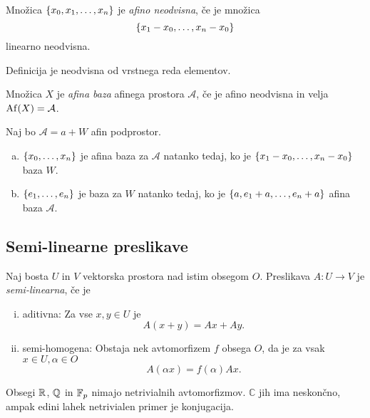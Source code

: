 \begin{definicija}
    Množica $\left\{x_0, x_1, \dots, x_n\right\}$ je \emph{afino neodvisna}, če je množica
    \[
    	\left\{x_1 - x_0, \dots, x_n - x_0\right\}
    \]
    linearno neodvisna.
\end{definicija}

\begin{opomba}
    Definicija je neodvisna od vrstnega reda elementov.
\end{opomba}

\begin{definicija}
    Množica $X$ je \emph{afina baza} afinega prostora $\mathcal{A}$, če je afino neodvisna in velja $\operatorname{Af} (X) = \mathcal{A}$.
\end{definicija}

\begin{izrek}
    Naj bo $\mathcal{A} = a + W$ afin podprostor.

	\begin{enumerate}[a)]
    \item $\left\{x_0, \dots, x_n\right\}$ je afina baza za $\mathcal{A}$ natanko tedaj, ko je $\left\{x_1 - x_0, \dots, x_n - x_0\right\}$ baza $W$.

    \item $\left\{e_1, \dots, e_n\right\}$ je baza za $W$ natanko tedaj, ko je $\left\{a, e_1 + a, \dots, e_n + a\right\}$ afina baza $\mathcal{A}$.	
	\end{enumerate}
\end{izrek}

\newpage

\subsection{Semi-linearne preslikave}

\begin{definicija}
    Naj bosta $U$ in $V$ vektorska prostora nad istim obsegom $O$. Preslikava $A \colon U \to V$ je \emph{semi-linearna}, če je
	
	\begin{enumerate}[(i)]
    \item aditivna: Za vse $x,y \in U$ je
    \[
    A(x + y) = Ax + Ay.    
    \]

    \item semi-homogena: Obstaja nek avtomorfizem $f$ obsega $O$, da je za vsak $x \in U, \alpha \in O$
    \[
    A(\alpha x) = f(\alpha) Ax.
    \]
	\end{enumerate}
\end{definicija}

\begin{opomba}
    Obsegi $\mathbb{R}$, $\mathbb{Q}$ in $\mathbb{F}_p$ nimajo netrivialnih avtomorfizmov. $\mathbb{C}$ jih ima neskončno, ampak edini lahek netrivialen primer je konjugacija.
\end{opomba}
